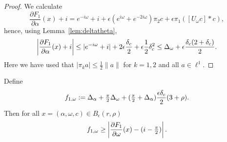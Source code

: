 \begin{proof}
	We calculate
\begin{equation*}
	\frac{\partial F_1}{\partial \alpha} (x) + i =
	e^{- i \omega} + i  
	+ \epsilon \left( e^{i \omega} + e^{-2 i  \omega} \right) \pi_2 c
	+ \epsilon \pi_1 ([ U_{\omega} c] * c) ,
\end{equation*}
hence, using Lemma~\ref{lem:deltatheta},
\begin{equation*}
	\left|  \frac{\partial F_1}{\partial \alpha} (x) + i  \right|   \leq 
| e^{-i \omega } +i | + 2 \epsilon \frac{\delta_c}{2} + \epsilon \frac{1}{2} \delta_c^2  
	\leq  \Delta_\omega +  \epsilon \frac{\delta_c  (2 + \delta_c)}{2} .
\end{equation*}
Here we have used that $|\pi_k a| \leq \frac{1}{2}\|a\|$ for $k=1,2$ and all $a \in \ell^1$.
\end{proof}



\begin{proposition}
		\label{prop:Z1w}
	Define
		\[
		f_{1,\omega} := 
		\Delta_\alpha + \tfrac{\pi}{2} \Delta_\omega + (\tfrac{\pi}{2} + \Delta_\alpha) \frac{  \epsilon \delta_c}{2} ( 3 + \rho)  .
		\]
Then for all $x= (\alpha,\omega,c) \in B_\epsilon(r,\rho)$
	\[
	f_{1,\omega} \geq   \left|  \frac{\partial F_1}{\partial \omega } (x)- (i- \tfrac{\pi}{2})  \right| .
	\]
\end{proposition}




